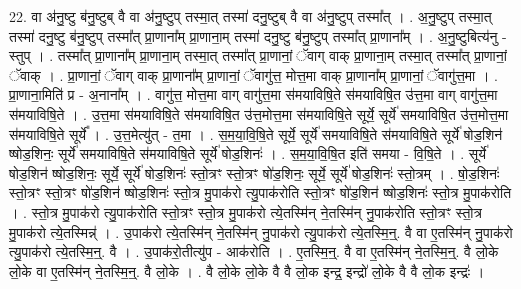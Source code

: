 \documentclass[17pt]{extarticle}
\begin{document}
22. वा अ॑नु॒ष्टु ब॑नु॒ष्टुब् वै वा अ॑नु॒ष्टुप् तस्मा॒त् तस्मा॑ दनु॒ष्टुब् वै वा अ॑नु॒ष्टुप् तस्मा᳚त् । . अ॒नु॒ष्टुप् तस्मा॒त् तस्मा॑ दनु॒ष्टु ब॑नु॒ष्टुप् तस्मा᳚त् प्रा॒णाना᳚म् प्रा॒णाना॒म् तस्मा॑ दनु॒ष्टु ब॑नु॒ष्टुप् तस्मा᳚त् प्रा॒णाना᳚म् । . अ॒नु॒ष्टुबित्य॑नु - स्तुप् । . तस्मा᳚त् प्रा॒णाना᳚म् प्रा॒णाना॒म् तस्मा॒त् तस्मा᳚त् प्रा॒णानां॒ ॅवाग् वाक् प्रा॒णाना॒म् तस्मा॒त् तस्मा᳚त् प्रा॒णानां॒ ॅवाक् । . प्रा॒णानां॒ ॅवाग् वाक् प्रा॒णाना᳚म् प्रा॒णानां॒ ॅवागु॑त्त॒ मोत्त॒मा वाक् प्रा॒णाना᳚म् प्रा॒णानां॒ ॅवागु॑त्त॒मा । . प्रा॒णाना॒मिति॑ प्र - अ॒नाना᳚म् । . वागु॑त्त॒ मोत्त॒मा वाग् वागु॑त्त॒मा स॑मयाविषि॒ते स॑मयाविषि॒त उ॑त्त॒मा वाग् वागु॑त्त॒मा स॑मयाविषि॒ते । . उ॒त्त॒मा स॑मयाविषि॒ते स॑मयाविषि॒त उ॑त्त॒मोत्त॒मा स॑मयाविषि॒ते सूर्ये॒ सूर्ये॑ समयाविषि॒त उ॑त्त॒मोत्त॒मा स॑मयाविषि॒ते सूर्ये᳚ । . उ॒त्त॒मेत्यु॑त् - त॒मा । . स॒म॒या॒वि॒षि॒ते सूर्ये॒ सूर्ये॑ समयाविषि॒ते स॑मयाविषि॒ते सूर्ये॑ षोड॒शिन॑ ष्षोड॒शिनः॒ सूर्ये॑ समयाविषि॒ते स॑मयाविषि॒ते सूर्ये॑ षोड॒शिनः॑ । . स॒म॒या॒वि॒षि॒त इति॑ समया - वि॒षि॒ते । . सूर्ये॑ षोड॒शिन॑ ष्षोड॒शिनः॒ सूर्ये॒ सूर्ये॑ षोड॒शिनः॑ स्तो॒त्रꣳ स्तो॒त्रꣳ षो॑ड॒शिनः॒ सूर्ये॒ सूर्ये॑ षोड॒शिनः॑ स्तो॒त्रम् । . षो॒ड॒शिनः॑ स्तो॒त्रꣳ स्तो॒त्रꣳ षो॑ड॒शिन॑ ष्षोड॒शिनः॑ स्तो॒त्र मु॒पाक॑रो त्यु॒पाक॑रोति स्तो॒त्रꣳ षो॑ड॒शिन॑ ष्षोड॒शिनः॑ स्तो॒त्र मु॒पाक॑रोति । . स्तो॒त्र मु॒पाक॑रो त्यु॒पाक॑रोति स्तो॒त्रꣳ स्तो॒त्र मु॒पाक॑रो त्ये॒तस्मि॑न् ने॒तस्मि॑न् नु॒पाक॑रोति स्तो॒त्रꣳ स्तो॒त्र मु॒पाक॑रो त्ये॒तस्मिन्न्॑ । . उ॒पाक॑रो त्ये॒तस्मि॑न् ने॒तस्मि॑न् नु॒पाक॑रो त्यु॒पाक॑रो त्ये॒तस्मि॒न्॒. वै वा ए॒तस्मि॑न् नु॒पाक॑रो त्यु॒पाक॑रो त्ये॒तस्मि॒न्॒. वै । . उ॒पाक॑रो॒तीत्यु॑प - आक॑रोति । . ए॒तस्मि॒न्॒. वै वा ए॒तस्मि॑न् ने॒तस्मि॒न्॒. वै लो॒के लो॒के वा ए॒तस्मि॑न् ने॒तस्मि॒न्॒. वै लो॒के । . वै लो॒के लो॒के वै वै लो॒क इन्द्र॒ इन्द्रो॑ लो॒के वै वै लो॒क इन्द्रः॑ । \newline
\end{document}
